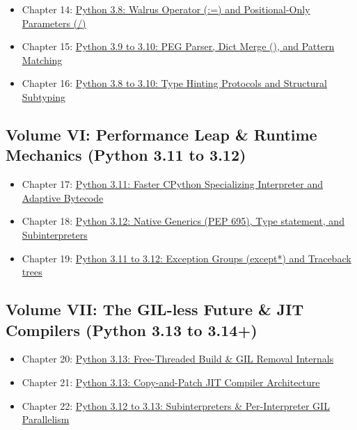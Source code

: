 \begin{itemize}
\tightlist
\item
  Chapter 14:
  \protect\hyperlink{chapter-14-python-38-walrus-operator-and-positional-only-parameters}{Python
  3.8: Walrus Operator (:=) and Positional-Only Parameters (/)}
\item
  Chapter 15:
  \protect\hyperlink{chapter-15-python-39-to-310-peg-parser-dict-merge-and-pattern-matching}{Python
  3.9 to 3.10: PEG Parser, Dict Merge (\textbar), and Pattern Matching}
\item
  Chapter 16:
  \protect\hyperlink{chapter-16-python-38-to-310-type-hinting-protocols-and-structural-subtyping}{Python
  3.8 to 3.10: Type Hinting Protocols and Structural Subtyping}
\end{itemize}

\hypertarget{volume-vi-performance-leap-runtime-mechanics-python-3.11-to-3.12}{%
\subsection{Volume VI: Performance Leap \& Runtime Mechanics (Python
3.11 to
3.12)}\label{volume-vi-performance-leap-runtime-mechanics-python-3.11-to-3.12}}

\begin{itemize}
\tightlist
\item
  Chapter 17:
  \protect\hyperlink{chapter-17-python-311-faster-cpython-specializing-interpreter-and-adaptive-bytecode}{Python
  3.11: Faster CPython Specializing Interpreter and Adaptive Bytecode}
\item
  Chapter 18:
  \protect\hyperlink{chapter-18-python-312-native-generics-pep-695-type-statement-and-subinterpreters}{Python
  3.12: Native Generics (PEP 695), Type statement, and Subinterpreters}
\item
  Chapter 19:
  \protect\hyperlink{chapter-19-python-311-to-312-exception-groups-and-traceback-trees}{Python
  3.11 to 3.12: Exception Groups (except*) and Traceback trees}
\end{itemize}

\hypertarget{volume-vii-the-gil-less-future-jit-compilers-python-3.13-to-3.14}{%
\subsection{Volume VII: The GIL-less Future \& JIT Compilers (Python
3.13 to
3.14+)}\label{volume-vii-the-gil-less-future-jit-compilers-python-3.13-to-3.14}}

\begin{itemize}
\tightlist
\item
  Chapter 20:
  \protect\hyperlink{chapter-20-python-313-free-threaded-build--gil-removal-internals}{Python
  3.13: Free-Threaded Build \& GIL Removal Internals}
\item
  Chapter 21:
  \protect\hyperlink{chapter-21-python-313-copy-and-patch-jit-compiler-architecture}{Python
  3.13: Copy-and-Patch JIT Compiler Architecture}
\item
  Chapter 22:
  \protect\hyperlink{chapter-22-python-312-to-313-subinterpreters--per-interpreter-gil-parallelism}{Python
  3.12 to 3.13: Subinterpreters \& Per-Interpreter GIL Parallelism}
\end{itemize}

